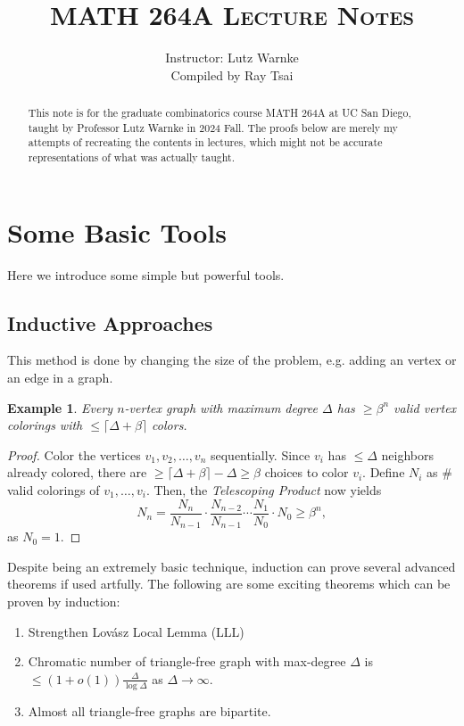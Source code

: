 \documentclass[a4paper]{article}
\title{\textsc{MATH 264A Lecture Notes}}
\author{Instructor: Lutz Warnke \\ \small{Compiled by Ray Tsai}}
\date{}
\newtheorem{example}[theorem]{Example}
\begin{document}
\maketitle

\begin{abstract}
  This note is for the graduate combinatorics course MATH 264A at UC San Diego, taught by Professor
  Lutz Warnke in 2024 Fall. The proofs below are merely my attempts of recreating the contents in
  lectures, which might not be accurate representations of what was actually taught. 
\end{abstract}

\section*{Some Basic Tools}

Here we introduce some simple but powerful tools.

\subsection*{Inductive Approaches}

This method is done by changing the size of the problem, e.g. adding an vertex or an edge in a
graph.

\begin{example}
  Every $n$-vertex graph with maximum degree $\Delta$ has $\geq \beta^n$ valid vertex colorings with
  $\leq \lceil \Delta + \beta \rceil$ colors.
\end{example}

\begin{proof}
  Color the vertices $v_1, v_2, \ldots, v_n$ sequentially. Since $v_i$ has $\leq \Delta$ neighbors
  already colored, there are $\geq \lceil \Delta + \beta \rceil - \Delta \geq \beta$ choices to
  color $v_i$. Define $N_i$ as $\#$ valid colorings of $v_1, \ldots, v_i$. Then, the
  \textit{Telescoping Product} now yields
  \[
    N_n = \frac{N_n}{N_{n - 1}} \cdot \frac{N_{n - 2}}{N_{n - 1}} \cdots \frac{N_{1}}{N_{0}} \cdot N_0 \geq \beta^n,
  \]
  as $N_0 = 1$.
\end{proof}

Despite being an extremely basic technique, induction can prove several advanced theorems if used
artfully. The following are some exciting theorems which can be proven by induction:

\begin{enumerate}
  \item Strengthen Lovász Local Lemma (LLL)
  \item Chromatic number of triangle-free graph with max-degree $\Delta$ is $\leq (1 +
  o(1))\frac{\Delta}{\log \Delta}$ as $\Delta \to \infty$.
  \item Almost all triangle-free graphs are bipartite.
\end{enumerate}
\end{document}
